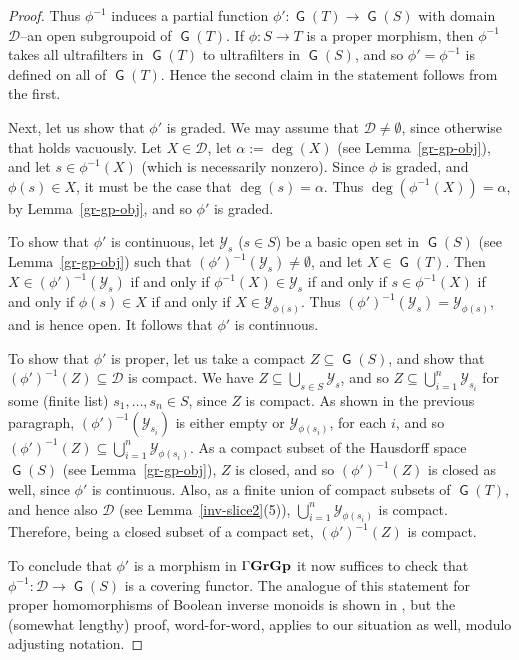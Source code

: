 \documentclass[a4paper,reqno,12pt]{amsart}
\numberwithin{equation}{section}
\theoremstyle{plain}
\theoremstyle{definition}
\newcommand{\GG}{\operatorname{\Gamma\bf{GrGp}}}
\newcommand{\GP}{\operatorname{\mathsf{G}}}
\begin{document}
\begin{proof}
Thus $\phi^{-1}$ induces a partial function $\phi': \GP(T) \to \GP(S)$ with domain $\mathcal{D}$--an open subgroupoid of $\GP(T)$. If $\phi : S \to T$ is a proper morphism, then $\phi^{-1}$ takes all ultrafilters in $\GP(T)$ to ultrafilters in $\GP(S)$, and so $\phi' = \phi^{-1}$ is defined on all of $\GP(T)$. Hence the second claim in the statement follows from the first.

Next, let us show that $\phi'$ is graded. We may assume that $\mathcal{D} \neq \emptyset$, since otherwise that holds vacuously. Let $X \in \mathcal{D}$, let $\alpha := \deg(X)$ (see Lemma~\ref{gr-gp-obj}), and let $s \in \phi^{-1}(X)$ (which is necessarily nonzero). Since $\phi$ is graded, and $\phi(s) \in X$, it must be the case that $\deg(s) = \alpha$. Thus $\deg(\phi^{-1}(X)) = \alpha$, by Lemma~\ref{gr-gp-obj}, and so $\phi'$ is graded.

To show that $\phi'$ is continuous, let $\mathcal{Y}_s$ ($s \in S$) be a basic open set in $\GP(S)$ (see Lemma~\ref{gr-gp-obj}) such that $(\phi')^{-1}(\mathcal{Y}_s) \neq \emptyset$, and let $X \in \GP(T)$. Then $X \in (\phi')^{-1}(\mathcal{Y}_s)$ if and only if $\phi^{-1}(X) \in \mathcal{Y}_s$ if and only if $s \in \phi^{-1}(X)$ if and only if $\phi(s) \in X$ if and only if $X \in \mathcal{Y}_{\phi(s)}$. Thus $(\phi')^{-1}(\mathcal{Y}_s) = \mathcal{Y}_{\phi(s)}$, and is hence open. It follows that $\phi'$ is continuous.

To show that $\phi'$ is proper, let us take a compact $Z \subseteq \GP(S)$, and show that $(\phi')^{-1}(Z)\subseteq \mathcal{D}$ is compact. We have $Z \subseteq \bigcup_{s\in S} \mathcal{Y}_s$, and so $Z \subseteq \bigcup_{i=1}^n \mathcal{Y}_{s_i}$ for some (finite list) $s_1, \dots, s_n \in S$, since $Z$ is compact. As shown in the previous paragraph, $(\phi')^{-1}(\mathcal{Y}_{s_i})$ is either empty or $\mathcal{Y}_{\phi(s_i)}$, for each $i$, and so $(\phi')^{-1}(Z) \subseteq \bigcup_{i=1}^n \mathcal{Y}_{\phi(s_i)}$. As a compact subset of the Hausdorff space $\GP(S)$ (see Lemma~\ref{gr-gp-obj}), $Z$ is closed, and so $(\phi')^{-1}(Z)$ is closed as well, since $\phi'$ is continuous. Also, as a finite union of compact subsets of $\GP(T)$, and hence also $\mathcal{D}$ (see Lemma~\ref{inv-slice2}(5)), $\bigcup_{i=1}^n \mathcal{Y}_{\phi(s_i)}$ is compact. Therefore, being a closed subset of a compact set, $(\phi')^{-1}(Z)$ is compact.

To conclude that $\phi'$ is a morphism in $\GG$ it now suffices to check that $\phi^{-1} : \mathcal{D} \to \GP(S)$ is a covering functor. The analogue of this statement for proper homomorphisms of Boolean inverse monoids is shown in \cite[Proposition 2.15]{Lawson2}, but the (somewhat lengthy) proof, word-for-word, applies to our situation as well, modulo adjusting notation.
\end{proof}
\end{document}
